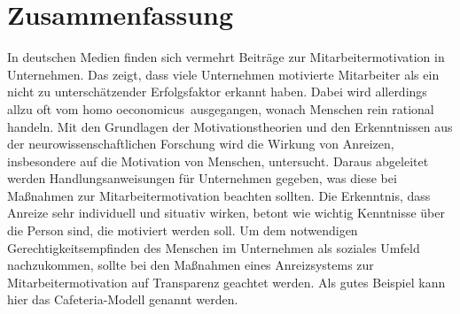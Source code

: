 \section*{Zusammenfassung}
\justifying
In deutschen Medien finden sich vermehrt Beiträge zur Mitarbeitermotivation in Unternehmen. Das zeigt, dass viele Unternehmen motivierte Mitarbeiter als ein nicht zu unterschätzender Erfolgsfaktor erkannt haben. Dabei wird allerdings allzu oft vom \glqq homo oeconomicus\grqq\ ausgegangen, wonach Menschen rein rational handeln. \newline
Mit den Grundlagen der Motivationstheorien und den Erkenntnissen aus der neurowissenschaftlichen Forschung wird die Wirkung von Anreizen, insbesondere auf die Motivation von Menschen, untersucht.
Daraus abgeleitet werden Handlungsanweisungen für Unternehmen gegeben, was diese bei Maßnahmen zur Mitarbeitermotivation beachten sollten. \newline
Die Erkenntnis, dass Anreize sehr individuell und situativ wirken, betont wie wichtig Kenntnisse über die Person sind, die motiviert werden soll. Um dem notwendigen Gerechtigkeitsempfinden des Menschen im Unternehmen als soziales Umfeld nachzukommen, sollte bei den Maßnahmen eines Anreizsystems zur Mitarbeitermotivation auf Transparenz geachtet werden. Als gutes Beispiel kann hier das Cafeteria-Modell genannt werden.
